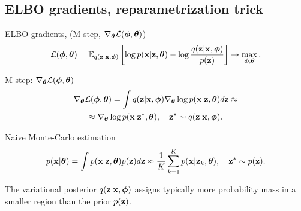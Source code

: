 \subsection{ELBO gradients, reparametrization trick}
\begin{frame}{ELBO gradients, (M-step, $\nabla_{\boldsymbol{\theta}} \mathcal{L}(\boldsymbol{\phi}, \boldsymbol{\theta})$)}
	\[
	\mathcal{L} (\boldsymbol{\phi}, \boldsymbol{\theta})  = \mathbb{E}_{q(\mathbf{z} | \mathbf{x}, \boldsymbol{\phi})} \left[\log p(\mathbf{x} | \mathbf{z}, \boldsymbol{\theta}) - \log \frac{q(\mathbf{z} | \mathbf{x}, \boldsymbol{\phi})}{p(\mathbf{z})} \right] \rightarrow \max_{\boldsymbol{\phi}, \boldsymbol{\theta}}.
	\]	
	\vspace{-0.5cm}
	\begin{block}{M-step: $\nabla_{\boldsymbol{\theta}} \mathcal{L}(\boldsymbol{\phi}, \boldsymbol{\theta})$}
		\vspace{-0.7cm}
		\begin{multline*}
			\nabla_{\boldsymbol{\theta}} \mathcal{L} (\boldsymbol{\phi}, \boldsymbol{\theta})
			= \int q(\mathbf{z}|\mathbf{x}, \boldsymbol{\phi}) \nabla_{\boldsymbol{\theta}}\log p(\mathbf{x}|\mathbf{z}, \boldsymbol{\theta}) d \mathbf{z} \approx  \\
			\approx \nabla_{\boldsymbol{\theta}}\log p(\mathbf{x}|\mathbf{z}^*, \boldsymbol{\theta}), \quad \mathbf{z}^* \sim q(\mathbf{z}|\mathbf{x}, \boldsymbol{\phi}).
		\end{multline*}
		\vspace{-0.9cm}
	\end{block}
	\begin{block}{Naive Monte-Carlo estimation}
		\vspace{-0.7cm}
		\[
		p(\mathbf{x} | \boldsymbol{\theta}) = \int p(\mathbf{x} | \mathbf{z}, \boldsymbol{\theta}) p(\mathbf{z}) d\mathbf{z} \approx \frac{1}{K} \sum_{k=1}^{K} p(\mathbf{x} | \mathbf{z}_k, \boldsymbol{\theta}), \quad \mathbf{z}^* \sim p(\mathbf{z}).
		\]
		\vspace{-0.5cm} 
	\end{block}
	The variational posterior $q(\mathbf{z}|\mathbf{x}, \boldsymbol{\phi})$ assigns typically more probability mass in a smaller region than the prior $p(\mathbf{z})$. 
\end{frame}
